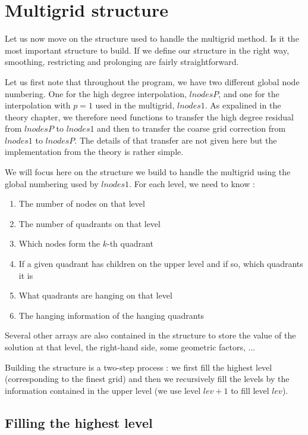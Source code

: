 \section{Multigrid structure}

Let us now move on the structure used to handle the multigrid method. Is it the most important structure to build. If we define our structure in the right way, smoothing, restricting and prolonging are fairly straightforward.

Let us first note that throughout the program, we have two different global node numbering. One for the high degree interpolation, $lnodesP$, and one for the interpolation with $p=1$ used in the multigrid, $lnodes1$. As expalined in the theory chapter, we therefore need functions to transfer the high degree residual from $lnodesP$ to $lnodes1$ and then to transfer the coarse grid correction from $lnodes1$ to $lnodesP$. The details of that transfer are not given here but the implementation from the theory is rather simple. 

We will focus here on the structure we build to handle the multigrid using the global numbering used by $lnodes1$. For each level, we need to know : 

\begin{enumerate}
\item The number of nodes on that level
\item The number of quadrants on that level
\item Which nodes form the $k$-th quadrant
\item If a given quadrant has children on the upper level and if so, which quadrants it is
\item What quadrants are hanging on that level
\item The hanging information of the hanging quadrants
\end{enumerate} 

Several other arrays are also contained in the structure to store the value of the solution at that level, the right-hand side, some geometric factors, ...

Building the structure is a two-step process : we first fill the highest level (corresponding to the finest grid) and then we recursively fill the levels by the information contained in the upper level (we use level $lev+1$ to fill level $lev$).

\subsection{Filling the highest level}

